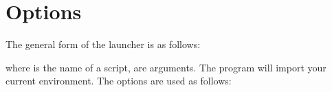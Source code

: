 \section{Options}
The general form of the  launcher is as follows:


where  is the name of a script,  are arguments.
The  program will import your current environment. 
The options are used as follows:
